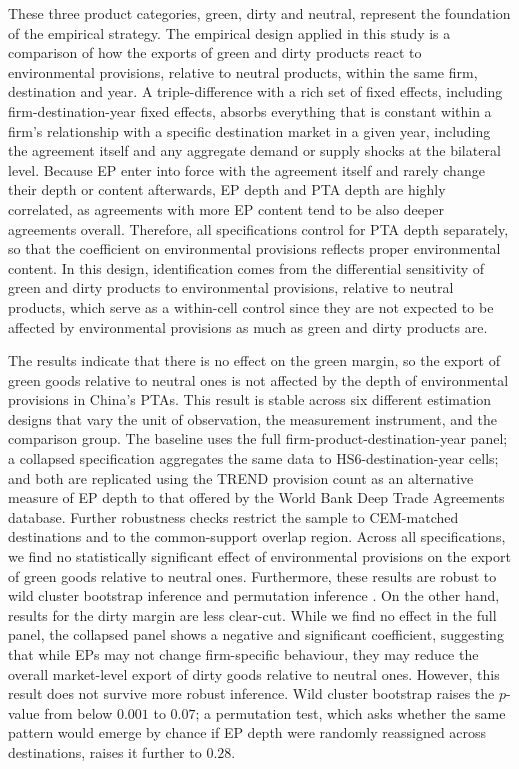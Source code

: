 \documentclass[12pt]{article}
\begin{document}
These three product categories, green, dirty and neutral, represent the foundation of the empirical strategy. The empirical design applied in this study is a comparison of how the exports of green and dirty products react to environmental provisions, relative to neutral products, within the same firm, destination and year. A triple-difference with a rich set of fixed effects, including firm-destination-year fixed effects, absorbs everything that is constant within a firm's relationship with a specific destination market in a given year, including the agreement itself and any aggregate demand or supply shocks at the bilateral level. Because EP enter into force with the agreement itself and rarely change their depth or content afterwards, EP depth and PTA depth are highly correlated, as agreements with more EP content tend to be also deeper agreements overall. Therefore, all specifications control for PTA depth separately, so that the coefficient on environmental provisions reflects proper environmental content. In this design, identification comes from the differential sensitivity of green and dirty products to environmental provisions, relative to neutral products, which serve as a within-cell control since they are not expected to be affected by environmental provisions as much as green and dirty products are.

The results indicate that there is no effect on the green margin, so the export of green goods relative to neutral ones is not affected by the depth of environmental provisions in China's PTAs. This result is stable across six different estimation designs that vary the unit of observation, the measurement instrument, and the comparison group. The baseline uses the full firm-product-destination-year panel; a collapsed specification aggregates the same data to HS6-destination-year cells; and both are replicated using the TREND provision count as an alternative measure of EP depth to that offered by the World Bank Deep Trade Agreements database. Further robustness checks restrict the sample to CEM-matched destinations and to the common-support overlap region. Across all specifications, we find no statistically significant effect of environmental provisions on the export of green goods relative to neutral ones. Furthermore, these results are robust to wild cluster bootstrap inference \citep{cameron2008} and permutation inference \citep{youngChannelingFisherRandomization2019}. On the other hand, results for the dirty margin are less clear-cut. While we find no effect in the full panel, the collapsed panel shows a negative and significant coefficient, suggesting that while EPs may not change firm-specific behaviour, they may reduce the overall market-level export of dirty goods relative to neutral ones. However, this result does not survive more robust inference. Wild cluster bootstrap raises the $p$-value from below $0.001$ to $0.07$; a permutation test, which asks whether the same pattern would emerge by chance if EP depth were randomly reassigned across destinations, raises it further to $0.28$.
\end{document}

